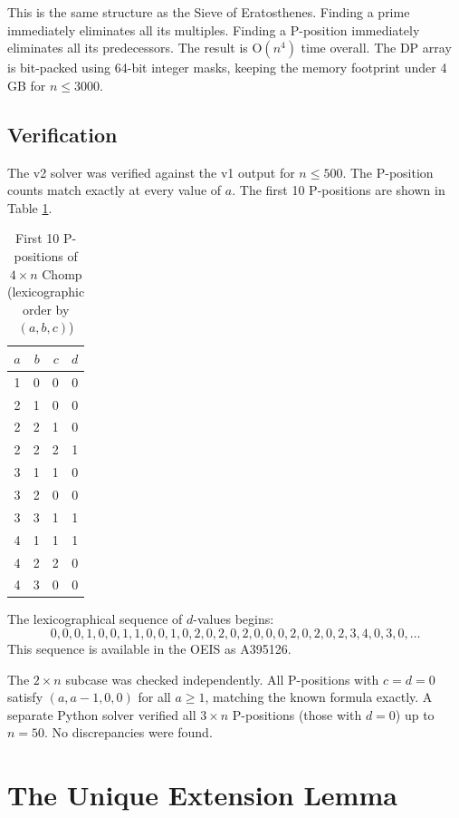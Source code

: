 \documentclass[12pt]{article}
\begin{document}
This is the same structure as the Sieve of Eratosthenes. Finding a
prime immediately eliminates all its multiples. Finding a P-position
immediately eliminates all its predecessors. The result is O$(n^4)$
time overall. The DP array is bit-packed using 64-bit integer masks,
keeping the memory footprint under 4 GB for $n \leq 3000$.

\subsection{Verification}

The v2 solver was verified against the v1 output for $n \leq 500$.
The P-position counts match exactly at every value of $a$. The first
10 P-positions are shown in Table \ref{tab:first10}.

\begin{table}[h]
\centering
\caption{First 10 P-positions of $4 \times n$ Chomp
         (lexicographic order by $(a,b,c)$)}
\begin{tabular}{rrrr}
\toprule
$a$ & $b$ & $c$ & $d$ \\
\midrule
 1 & 0 & 0 & 0 \\
 2 & 1 & 0 & 0 \\
 2 & 2 & 1 & 0 \\
 2 & 2 & 2 & 1 \\
 3 & 1 & 1 & 0 \\
 3 & 2 & 0 & 0 \\
 3 & 3 & 1 & 1 \\
 4 & 1 & 1 & 1 \\
 4 & 2 & 2 & 0 \\
 4 & 3 & 0 & 0 \\
\bottomrule
\end{tabular}
\label{tab:first10}
\end{table}

The lexicographical sequence of $d$-values begins:
\[
0, 0, 0, 1, 0, 0, 1, 1, 0, 0, 1, 0, 2, 0, 2, 0, 2, 0, 0, 0,
2, 0, 2, 0, 2, 3, 4, 0, 3, 0, \ldots
\]
This sequence is available in the OEIS as A395126.

The $2 \times n$ subcase was checked independently. All P-positions
with $c = d = 0$ satisfy $(a, a-1, 0, 0)$ for all $a \geq 1$, matching
the known formula exactly. A separate Python solver verified all
$3 \times n$ P-positions (those with $d = 0$) up to $n = 50$. No
discrepancies were found.

\section{The Unique Extension Lemma}
\label{sec:unique}
\end{document}
